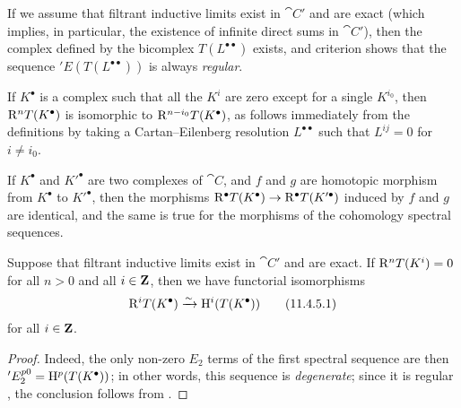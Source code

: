 \begin{env}[11.4.3]
If we assume that filtrant inductive limits exist in $\cat{C}'$ and are exact (which implies, in particular, the existence of infinite direct sums in $\cat{C}'$), then the complex defined by the bicomplex $T(L^{\bullet\bullet})$ exists, and criterion  shows that the sequence $'E(T(L^{\bullet\bullet}))$ is always \emph{regular}.

If $K^\bullet$ is a complex such that all the $K^i$ are zero except for a single $K^{i_0}$, then
$\mathrm{R}^n T(K^\bullet)$ is isomorphic to $\mathrm{R}^{n-i_0} T(K^\bullet)$, as follows immediately from the definitions by taking a Cartan--Eilenberg resolution $L^{\bullet\bullet}$ such that $L^{ij}=0$ for $i\neq i_0$.

If $K^\bullet$ and $K'^\bullet$ are two complexes of $\cat{C}$, and $f$ and $g$ are homotopic morphism from $K^\bullet$ to $K'^\bullet$, then the morphisms $\mathrm{R}^\bullet T(K^\bullet) \rightarrow \mathrm{R}^\bullet T(K'^\bullet)$ induced by $f$ and $g$ are identical, and the same is true for the morphisms of the cohomology spectral sequences.
\end{env}

\begin{proposition}[11.4.5]
\label{0.11.4.5}
Suppose that filtrant inductive limits exist in $\cat{C}'$ and are exact.
If $\mathrm{R}^n T(K^i) = 0$ for all $n>0$ and all $i\in\mathbf{Z}$, then we have functorial isomorphisms
\[
\label{0.11.4.5.1}
  \mathrm{R}^i T(K^\bullet) \xrightarrow{\sim} \mathrm{H}^i(T(K^\bullet))
\tag{11.4.5.1}
\]
for all $i\in\mathbf{Z}$.
\end{proposition}

\begin{proof}
Indeed, the only non-zero $E_2$ terms of the first spectral sequence  are then $'E_2^{p0} = \mathrm{H}^p(T(K^\bullet))$;
in other words, this sequence is \emph{degenerate};
since it is regular , the conclusion follows from .
\end{proof}

